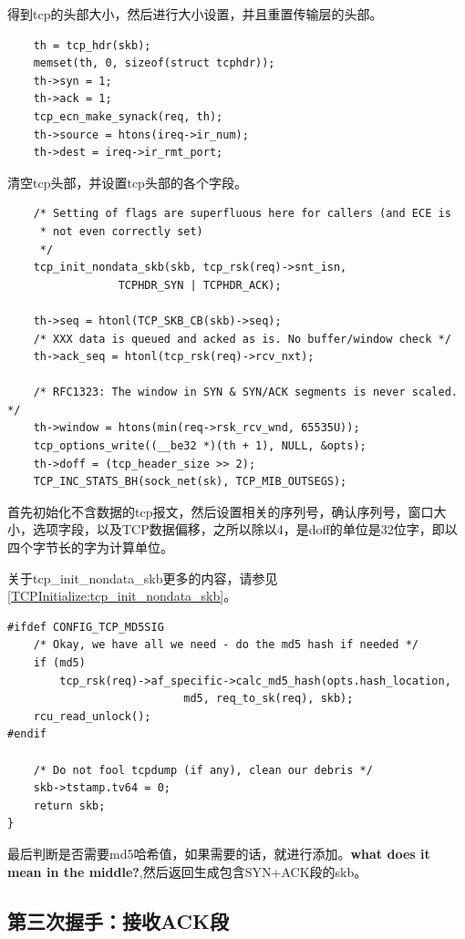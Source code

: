     得到tcp的头部大小，然后进行大小设置，并且重置传输层的头部。

\begin{verbatim}
    th = tcp_hdr(skb);
    memset(th, 0, sizeof(struct tcphdr));
    th->syn = 1;
    th->ack = 1;
    tcp_ecn_make_synack(req, th);
    th->source = htons(ireq->ir_num);
    th->dest = ireq->ir_rmt_port;
\end{verbatim}

    清空tcp头部，并设置tcp头部的各个字段。

\begin{verbatim}
    /* Setting of flags are superfluous here for callers (and ECE is
     * not even correctly set)
     */
    tcp_init_nondata_skb(skb, tcp_rsk(req)->snt_isn,
                 TCPHDR_SYN | TCPHDR_ACK);

    th->seq = htonl(TCP_SKB_CB(skb)->seq);
    /* XXX data is queued and acked as is. No buffer/window check */
    th->ack_seq = htonl(tcp_rsk(req)->rcv_nxt);

    /* RFC1323: The window in SYN & SYN/ACK segments is never scaled. */
    th->window = htons(min(req->rsk_rcv_wnd, 65535U));
    tcp_options_write((__be32 *)(th + 1), NULL, &opts);
    th->doff = (tcp_header_size >> 2);
    TCP_INC_STATS_BH(sock_net(sk), TCP_MIB_OUTSEGS);
\end{verbatim}

    首先初始化不含数据的tcp报文，然后设置相关的序列号，确认序列号，窗口大小，选项字段，以及TCP数据偏移，之所以除以4，是doff的单位是32位字，即以四个字节长的字为计算单位。
           
	关于tcp\_init\_nondata\_skb更多的内容，请参见\ref{TCPInitialize:tcp_init_nondata_skb}。
     
\begin{verbatim}
#ifdef CONFIG_TCP_MD5SIG
    /* Okay, we have all we need - do the md5 hash if needed */
    if (md5)
        tcp_rsk(req)->af_specific->calc_md5_hash(opts.hash_location,
                           md5, req_to_sk(req), skb);
    rcu_read_unlock();
#endif

    /* Do not fool tcpdump (if any), clean our debris */
    skb->tstamp.tv64 = 0;
    return skb;
}
\end{verbatim}

    最后判断是否需要md5哈希值，如果需要的话，就进行添加。\textbf{what does it mean in the middle?},然后返回生成包含SYN+ACK段的skb。     

        \subsection{第三次握手：接收ACK段}

